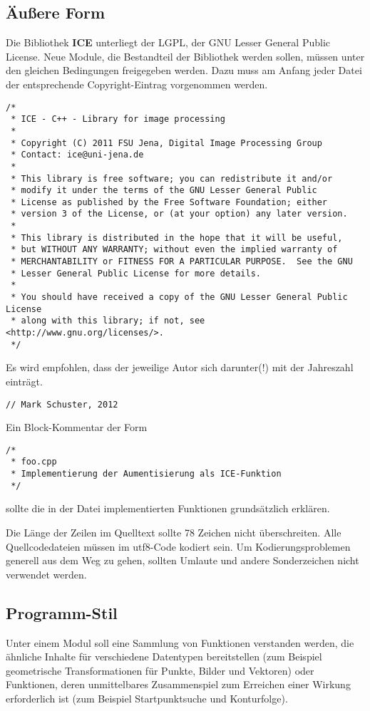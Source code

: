 
\subsection{Äußere Form}
Die Bibliothek {\bf ICE} unterliegt der LGPL, der GNU Lesser General Public
License. Neue Module, die Bestandteil der Bibliothek werden sollen, müssen
unter den gleichen Bedingungen freigegeben werden. Dazu muss am Anfang jeder
Datei der entsprechende Copyright-Eintrag vorgenommen werden.

\begin{verbatim}
/*
 * ICE - C++ - Library for image processing 
 *
 * Copyright (C) 2011 FSU Jena, Digital Image Processing Group
 * Contact: ice@uni-jena.de
 *
 * This library is free software; you can redistribute it and/or
 * modify it under the terms of the GNU Lesser General Public
 * License as published by the Free Software Foundation; either
 * version 3 of the License, or (at your option) any later version.
 *
 * This library is distributed in the hope that it will be useful,
 * but WITHOUT ANY WARRANTY; without even the implied warranty of
 * MERCHANTABILITY or FITNESS FOR A PARTICULAR PURPOSE.  See the GNU
 * Lesser General Public License for more details.
 *
 * You should have received a copy of the GNU Lesser General Public License 
 * along with this library; if not, see <http://www.gnu.org/licenses/>.
 */
\end{verbatim}

Es wird empfohlen, dass der jeweilige Autor sich darunter(!) mit der Jahreszahl
einträgt.

\begin{verbatim}
// Mark Schuster, 2012
\end{verbatim}

Ein Block-Kommentar der Form
\begin{verbatim}
/*
 * foo.cpp
 * Implementierung der Aumentisierung als ICE-Funktion
 */
\end{verbatim}
sollte die in der Datei implementierten Funktionen grundsätzlich erklären.

Die Länge der Zeilen im Quelltext sollte 78 Zeichen nicht überschreiten. Alle
Quellcodedateien müssen im utf8-Code kodiert sein. Um Kodierungsproblemen
generell aus dem Weg zu gehen, sollten Umlaute und andere Sonderzeichen nicht
verwendet werden. 

\subsection{Programm-Stil}
Unter einem Modul soll eine Sammlung von Funktionen verstanden werden, die
ähnliche Inhalte für verschiedene Datentypen bereitstellen (zum Beispiel
geometrische Transformationen für Punkte, Bilder und Vektoren) oder Funktionen,
deren unmittelbares Zusammenspiel zum Erreichen einer Wirkung erforderlich
ist (zum Beispiel Startpunktsuche und Konturfolge). 

